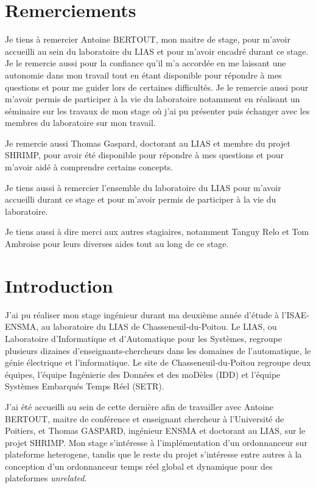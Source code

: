 \documentclass{article}
\begin{document}
    \newpage
    \section*{Remerciements}

    Je tiens à remercier Antoine BERTOUT, mon maitre de stage, pour m'avoir accueilli au sein du laboratoire du LIAS et pour m'avoir encadré durant ce stage. Je le remercie aussi pour la confiance qu'il m'a accordée en me laissant une autonomie dans mon travail tout en étant disponible pour répondre à mes questions et pour me guider lors de certaines difficultés. Je le remercie aussi pour m'avoir permis de participer à la vie du laboratoire notamment en réalisant un séminaire sur les travaux de mon stage où j'ai pu présenter puis échanger avec les membres du laboratoire sur mon travail.
    
    Je remercie aussi Thomas Gaspard, doctorant au LIAS et membre du projet SHRIMP, pour avoir été disponible pour répondre à mes questions et pour m'avoir aidé à comprendre certains concepts.

    Je tiens aussi à remercier l'ensemble du laboratoire du LIAS pour m'avoir accueilli durant ce stage et pour m'avoir permis de participer à la vie du laboratoire.

    Je tiens aussi à dire merci aux autres stagiaires, notamment Tanguy Relo et Tom Ambroise pour leurs diverses aides tout au long de ce stage.
    
    \newpage
    \tableofcontents

    \newpage
    \thispagestyle{empty}
    \mbox{}
    \newpage
    
    \section{Introduction}

    
    J'ai pu réaliser mon stage ingénieur durant ma deuxième année d'étude à l'ISAE-ENSMA, au laboratoire du LIAS de Chasseneuil-du-Poitou. Le LIAS, ou Laboratoire d'Informatique et d'Automatique pour les Systèmes, regroupe plusieurs dizaines d'enseignants-chercheurs dans les domaines de l'automatique, le génie électrique et l'informatique. Le site de Chasseneuil-du-Poitou regroupe deux équipes, l'équipe Ingénierie des Données et des moDèles (IDD) et l'équipe Systèmes Embarqués Temps Réel (SETR). 

    J'ai été accueilli au sein de cette dernière afin de travailler avec Antoine BERTOUT, maitre de conférence et enseignant chercheur à l'Université de Poitiers, et Thomas GASPARD, ingénieur ENSMA et doctorant au LIAS, sur le projet \gls{SHRIMP}. Mon stage s'intéresse à l'implémentation d'un \gls{ordonnanceur} sur \gls{plateforme heterogene}\cite{bertout2020workload}, tandis que le reste du projet s'intéresse entre autres à la conception d'un \gls{ordonnanceur} temps réel global et dynamique pour des plateformes \textit{unrelated}.
\end{document}
